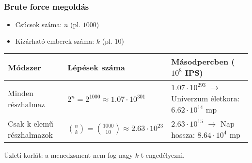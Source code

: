 \begin{frame}
\frametitle{Brute force megoldás}

\begin{footnotesize}
\begin{itemize}
\item Csúcsok száma: $n$ (pl. $1000$)
\item Kizárható emberek száma: $k$ (pl. $10$)
\end{itemize}
\end{footnotesize}

\begin{footnotesize}
\renewcommand{\arraystretch}{1.2}
\begin{center}
\begin{tabular}{ l | l | l }
Módszer & Lépések száma & Másodpercben ($10^8$ IPS) \\
\hline
\hline
Minden részhalmaz &
$2^n = 2^{1000} \approx 1.07\cdot10^{301}$ &
$1.07\cdot10^{293}$ $\rightarrow$ Univerzum életkora: $6.62\cdot10^{14}$ mp\\
\hline
Csak k elemű részhalmazok &
${{n}\choose{k}} = {{1000}\choose{10}} \approx 2.63\cdot10^{23}$ &
$2.63\cdot10^{15}$ $\rightarrow$ Nap hossza: $8.64\cdot10^{4}$ mp\\
\end{tabular}
\end{center}
\renewcommand{\arraystretch}{1}
\end{footnotesize}

Üzleti korlát: a menedzsment nem fog nagy $k$-t engedélyezni.

\end{frame}

